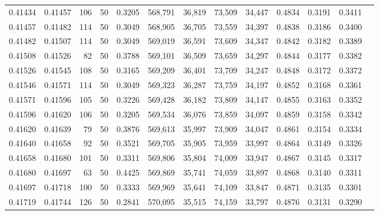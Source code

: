 \begin{tabular}{rrrrrrrrrrrrr}
0.41434 & 0.41457 &   106 &  50 &                                     0.3205 & 568,791 &  36,819 &  73,509 &  34,447 & 0.4834 & 0.3191 & 0.3411 \\
0.41457 & 0.41482 &   114 &  50 &                                     0.3049 & 568,905 &  36,705 &  73,559 &  34,397 & 0.4838 & 0.3186 & 0.3400 \\
0.41482 & 0.41507 &   114 &  50 &                                     0.3049 & 569,019 &  36,591 &  73,609 &  34,347 & 0.4842 & 0.3182 & 0.3389 \\
0.41508 & 0.41526 &    82 &  50 &                                     0.3788 & 569,101 &  36,509 &  73,659 &  34,297 & 0.4844 & 0.3177 & 0.3382 \\
0.41526 & 0.41545 &   108 &  50 &                                     0.3165 & 569,209 &  36,401 &  73,709 &  34,247 & 0.4848 & 0.3172 & 0.3372 \\
0.41546 & 0.41571 &   114 &  50 &                                     0.3049 & 569,323 &  36,287 &  73,759 &  34,197 & 0.4852 & 0.3168 & 0.3361 \\
0.41571 & 0.41596 &   105 &  50 &                                     0.3226 & 569,428 &  36,182 &  73,809 &  34,147 & 0.4855 & 0.3163 & 0.3352 \\
0.41596 & 0.41620 &   106 &  50 &                                     0.3205 & 569,534 &  36,076 &  73,859 &  34,097 & 0.4859 & 0.3158 & 0.3342 \\
0.41620 & 0.41639 &    79 &  50 &                                     0.3876 & 569,613 &  35,997 &  73,909 &  34,047 & 0.4861 & 0.3154 & 0.3334 \\
0.41640 & 0.41658 &    92 &  50 &                                     0.3521 & 569,705 &  35,905 &  73,959 &  33,997 & 0.4864 & 0.3149 & 0.3326 \\
0.41658 & 0.41680 &   101 &  50 &                                     0.3311 & 569,806 &  35,804 &  74,009 &  33,947 & 0.4867 & 0.3145 & 0.3317 \\
0.41680 & 0.41697 &    63 &  50 &                                     0.4425 & 569,869 &  35,741 &  74,059 &  33,897 & 0.4868 & 0.3140 & 0.3311 \\
0.41697 & 0.41718 &   100 &  50 &                                     0.3333 & 569,969 &  35,641 &  74,109 &  33,847 & 0.4871 & 0.3135 & 0.3301 \\
0.41719 & 0.41744 &   126 &  50 &                                     0.2841 & 570,095 &  35,515 &  74,159 &  33,797 & 0.4876 & 0.3131 & 0.3290 \\

\end{tabular}
